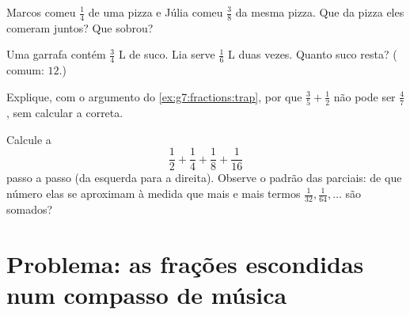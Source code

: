 \begin{exercise}[$\star\star$]\label{exo:g7:fractions:9}
Marcos comeu $\frac14$ de uma pizza e Júlia comeu $\frac38$ da mesma
pizza. Que  da pizza eles comeram juntos? Que  sobrou?
\end{exercise}

\begin{exercise}[$\star\star$]\label{exo:g7:fractions:10}
Uma garrafa contém $\frac34$ L de suco. Lia serve $\frac16$ L duas
vezes. Quanto suco resta? ( comum: $12$.)
\end{exercise}

\begin{exercise}[$\star\star$]\label{exo:g7:fractions:11}
Explique, com o argumento do \cref{ex:g7:fractions:trap}, por que
$\frac35 + \frac12$ não pode ser $\frac{4}{7}$, sem calcular a 
correta.
\end{exercise}

\begin{exercise}[$\star\star\star$]\label{exo:g7:fractions:12}
Calcule a 
\[
\frac12 + \frac14 + \frac18 + \frac{1}{16}
\]
passo a passo (da esquerda para a direita). Observe o padrão das 
parciais: de que número elas se aproximam à medida que mais e mais
termos $\frac{1}{32}, \frac{1}{64}, \dots$ são somados?
\end{exercise}

\section{Problema: as frações escondidas num compasso de música}

